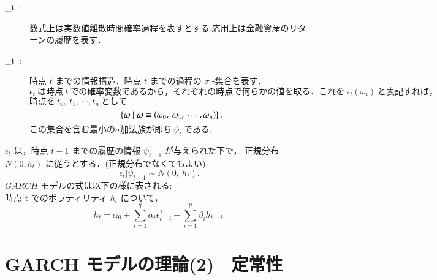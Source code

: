\documentclass[slide,10pt]{jsarticle}
\def\vector#1{\mbox{\boldmath $#1$}}
\def\sheet #1{\section*{\centering \large \bfseries #1}}
\begin{document}
{\huge
\begin{description}
	\item[{\Huge \epsilon_t}\ :\ ] 数式上は実数値離散時間確率過程を表すとする.応用上は金融資産のリターンの履歴を表す．
	\item[{\Huge \psi_t}\ :\ ] 時点 $t$ までの情報構造．時点 $t$ までの過程の $\sigma$ -集合を表す．\\
		$\epsilon_t\ は時点\ t\ での確率変数であるから，それぞれの時点で何らかの値を取る．これを\ \epsilon_t(\omega_t)\ と表記すれば，$
		$時点を\ t_0,\ t_1,\ \cdots,t_n\ として$
		\[
			\left\{\vector{\omega}\ |\ \vector{\omega} \equiv (\omega_0,\ \omega_1,\ \cdots,\omega_n) \right\}.
		\]
		$この集合を含む最小の \sigma 加法族が即ち\ \psi_t\ である.$
\end{description}
$\epsilon_t$ は，時点 $t-1$ までの履歴の情報 $\psi_{t-1}$ が与えられた下で， 正規分布 $N(0, h_t)$ に従うとする．(正規分布でなくてもよい)
\[
	\epsilon_t|\psi_{t-1} \sim N(0,\ h_t).
\]
$GARCH$ モデルの式は以下の様に表される: \\
\qquad 時点 t でのボラティリティ $h_t$ について，
\[
	h_t = \alpha_0 + \sum_{i=1}^{q} \alpha_i \epsilon_{t-i}^2 + \sum_{i=1}^{p} \beta_i h_{t-i}.
\]
}

\sheet{\Huge GARCH モデルの理論(2)　定常性}
\end{document}
